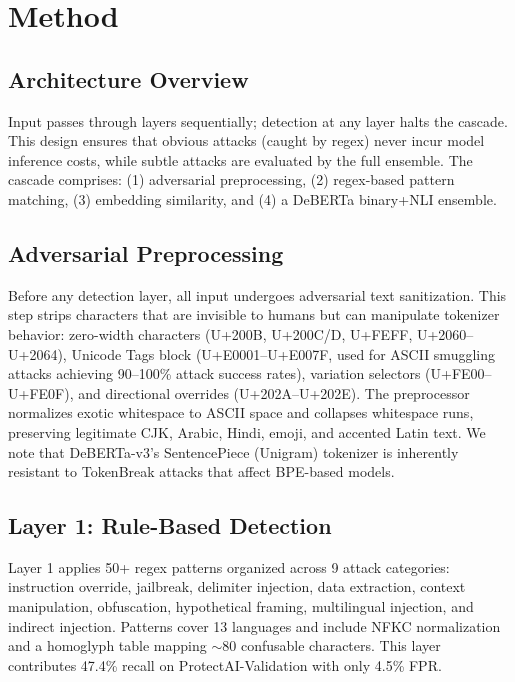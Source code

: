 \documentclass[11pt]{article}
\begin{document}
\section{Method}

\subsection{Architecture Overview}

Input passes through layers sequentially; detection at any layer halts the cascade. This design ensures that obvious attacks (caught by regex) never incur model inference costs, while subtle attacks are evaluated by the full ensemble. The cascade comprises: (1) adversarial preprocessing, (2) regex-based pattern matching, (3) embedding similarity, and (4) a DeBERTa binary+NLI ensemble.

\subsection{Adversarial Preprocessing}

Before any detection layer, all input undergoes adversarial text sanitization. This step strips characters that are invisible to humans but can manipulate tokenizer behavior: zero-width characters (U+200B, U+200C/D, U+FEFF, U+2060--U+2064), Unicode Tags block (U+E0001--U+E007F, used for ASCII smuggling attacks achieving 90--100\% attack success rates), variation selectors (U+FE00--U+FE0F), and directional overrides (U+202A--U+202E). The preprocessor normalizes exotic whitespace to ASCII space and collapses whitespace runs, preserving legitimate CJK, Arabic, Hindi, emoji, and accented Latin text. We note that DeBERTa-v3's SentencePiece (Unigram) tokenizer is inherently resistant to TokenBreak attacks that affect BPE-based models.

\subsection{Layer 1: Rule-Based Detection}

Layer 1 applies 50+ regex patterns organized across 9 attack categories: instruction override, jailbreak, delimiter injection, data extraction, context manipulation, obfuscation, hypothetical framing, multilingual injection, and indirect injection. Patterns cover 13 languages and include NFKC normalization and a homoglyph table mapping $\sim$80 confusable characters. This layer contributes 47.4\% recall on ProtectAI-Validation with only 4.5\% FPR.
\end{document}
